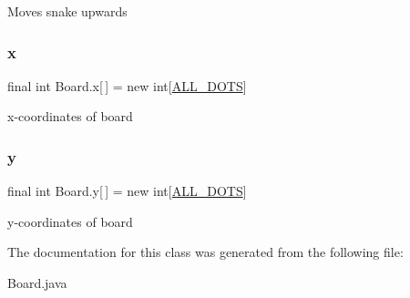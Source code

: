 Moves snake upwards \mbox{\label{class_board_a1644d1bf67cadaa59812ec1b5d9d5a19}} 
\subsubsection{\texorpdfstring{x}{x}}
{\footnotesize\ttfamily final int Board.\+x\mbox{[}$\,$\mbox{]} = new int\mbox{[}\hyperlink{class_board_afc3dba6349ee431f748fdcaee99b78b7}{A\+L\+L\+\_\+\+D\+O\+TS}\mbox{]}}

x-\/coordinates of board \mbox{\label{class_board_a8bcec6f1642775fa45aa60e0710732a4}} 
\subsubsection{\texorpdfstring{y}{y}}
{\footnotesize\ttfamily final int Board.\+y\mbox{[}$\,$\mbox{]} = new int\mbox{[}\hyperlink{class_board_afc3dba6349ee431f748fdcaee99b78b7}{A\+L\+L\+\_\+\+D\+O\+TS}\mbox{]}}

y-\/coordinates of board 

The documentation for this class was generated from the following file\+:\begin{DoxyCompactItemize}
\item 
Board.\+java\end{DoxyCompactItemize}

